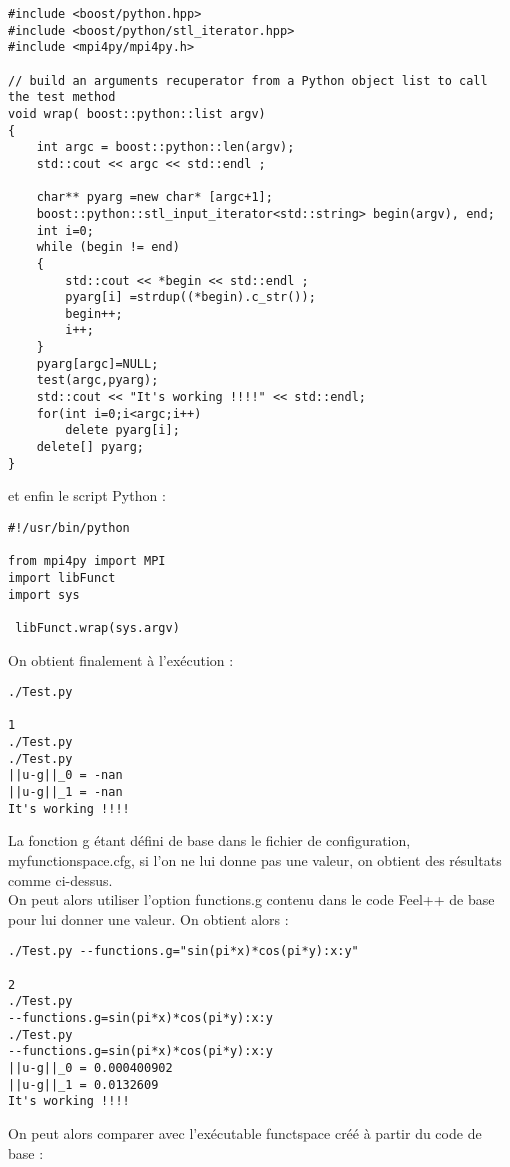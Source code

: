 \documentclass[12pt]{article}
\begin{document}
\begin{lstlisting}
#include <boost/python.hpp>
#include <boost/python/stl_iterator.hpp>
#include <mpi4py/mpi4py.h>

// build an arguments recuperator from a Python object list to call the test method
void wrap( boost::python::list argv)
{
    int argc = boost::python::len(argv);
    std::cout << argc << std::endl ;
        
    char** pyarg =new char* [argc+1];
    boost::python::stl_input_iterator<std::string> begin(argv), end;
    int i=0;
    while (begin != end)
    {
        std::cout << *begin << std::endl ;
        pyarg[i] =strdup((*begin).c_str());
        begin++;
        i++;
    }
    pyarg[argc]=NULL;
    test(argc,pyarg);
    std::cout << "It's working !!!!" << std::endl; 
    for(int i=0;i<argc;i++)
        delete pyarg[i];
    delete[] pyarg;
}
\end{lstlisting}
et enfin le script Python :

\begin{lstlisting}
#!/usr/bin/python

from mpi4py import MPI
import libFunct
import sys

 libFunct.wrap(sys.argv)
\end{lstlisting}

On obtient finalement à l'exécution :

\begin{verbatim}
./Test.py

1
./Test.py
./Test.py
||u-g||_0 = -nan
||u-g||_1 = -nan
It's working !!!!
\end{verbatim}

La fonction g étant défini de base dans le fichier de configuration, myfunctionspace.cfg, si l'on ne lui donne pas une valeur, on obtient des résultats comme ci-dessus.\\
On peut alors utiliser l'option functions.g contenu dans le code Feel++ de base pour lui donner une valeur. On obtient alors :

\begin{verbatim}
./Test.py --functions.g="sin(pi*x)*cos(pi*y):x:y"

2
./Test.py
--functions.g=sin(pi*x)*cos(pi*y):x:y
./Test.py
--functions.g=sin(pi*x)*cos(pi*y):x:y
||u-g||_0 = 0.000400902
||u-g||_1 = 0.0132609
It's working !!!!
\end{verbatim}

On peut alors comparer avec l'exécutable functspace créé à partir du code de base :
\end{document}
